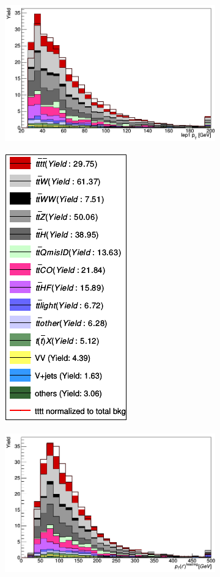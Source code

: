 \begin{figure}[H]
\begin{subfigure}{.5\textwidth}
  \centering
  \includegraphics[width=.99\linewidth]{figs/features/lep_1_pt}
\end{subfigure}%
\begin{subfigure}{.5\textwidth}
  \centering
  \includegraphics[width=.29\linewidth]{figs/features/legende}
\end{subfigure}
\begin{subfigure}{.5\textwidth}
  \centering
  \includegraphics[width=.99\linewidth]{figs/features/lep_0_pt}

\end{subfigure}
\end{figure}
